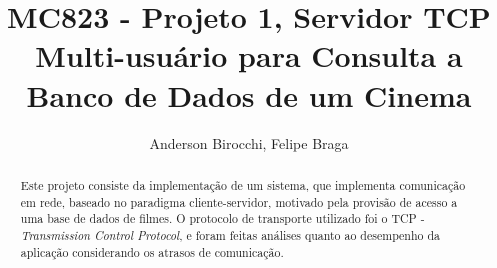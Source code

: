 \documentclass[11pt,twoside]{article}
\begin{document}
%

%



\TRMakeCover


%
\pagestyle{myheadings}

%
\title{MC823 - Projeto 1, Servidor TCP Multi-usuário para Consulta a Banco de Dados de um Cinema}

\author{Anderson Birocchi, Felipe Braga}

\date{}

\newpage
\tableofcontents
\newpage

\maketitle




\begin{abstract}
Este projeto consiste da implementação de um sistema, que implementa comunicação em rede, baseado no paradigma cliente-servidor, motivado pela provisão de acesso a uma base de dados de filmes. O protocolo de transporte utilizado foi o TCP - \textit{Transmission Control Protocol}, e foram feitas análises quanto ao desempenho da aplicação considerando os atrasos de comunicação.
\end{abstract}
\end{document}
